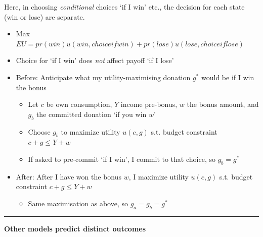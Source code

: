 \documentclass[]{article}
\providecommand{\tightlist}{%
  \setlength{\itemsep}{0pt}\setlength{\parskip}{0pt}}
\begin{document}
Here, in choosing \emph{conditional} choices `if I win' etc., the
decision for each state (win or lose) are separate.

\begin{itemize}
\tightlist
\item
  Max
  \(EU = pr(win)u(win,choice if win) + pr(lose)u(lose,choice if lose)\)
\item
  Choice for `if I win' does \emph{not} affect payoff `if I lose'
\end{itemize}

\begin{itemize}
\tightlist
\item
  Before: Anticipate what my utility-maximising donation \(g^*\) would
  be if I win the bonus

  \begin{itemize}
  \tightlist
  \item
    Let \(c\) be own consumption, \(Y\) income pre-bonus, \(w\) the
    bonus amount, and \(g_b\) the committed donation `if you win \(w\)'
  \item
    Choose \(g_b\) to maximize utility \(u(c, g)\) s.t. budget
    constraint \(c+g \leq Y+w\)
  \item
    If asked to pre-commit `if I win', I commit to that choice, so
    \(g_b=g^*\)
  \end{itemize}
\end{itemize}

\begin{itemize}
\tightlist
\item
  After: After I have won the bonus \(w\), I maximize utility
  \(u(c, g)\) s.t. budget constraint \(c+g \leq Y+w\)

  \begin{itemize}
  \tightlist
  \item
    Same maximisation as above, so \(g_a=g_b=g^*\)
  \end{itemize}
\end{itemize}

\begin{center}\rule{0.5\linewidth}{\linethickness}\end{center}

\textbf{Other models predict distinct outcomes}
\end{document}

